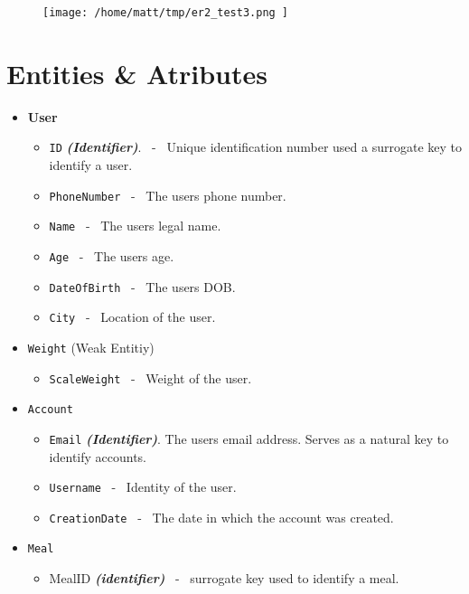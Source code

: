 \documentclass{report}
\title{\Huge{}}
\author{\huge{Matt Warner}}
\date{\huge{}}
\begin{document}
    \maketitle
\begin{figure}[ht]
\centering
\texttt{[image:  /home/matt/tmp/er2\_test3.png ]}
\end{figure}
\newpage
\section{Entities \& Atributes}
\begin{itemize}
    \item \textbf{User}
        \begin{itemize}[label=$\circ$]
            \item \texttt{ID} \textit{\textbf{(Identifier)}}. \ - \ Unique identification number used a surrogate key to identify a user.
            \item \texttt{PhoneNumber}  \ - \ The users phone number.
            \item \texttt{Name} \ - \ The users legal name.
            \item \texttt{Age} \ - \ The users age.
            \item \texttt{DateOfBirth} \ - \ The users DOB.
            \item \texttt{City} \ - \ Location of the user.
        \end{itemize}
    \item \texttt{Weight} (Weak Entitiy)
        \begin{itemize}[label=$\circ$]
            \item \texttt{ScaleWeight} \ - \ Weight of the user.
        \end{itemize}
    \item \texttt{Account}
        \begin{itemize}[label=$\circ$]
            \item \texttt{Email} \textit{\textbf{(Identifier)}}. The users email address. Serves as a natural key to identify accounts.
            \item \texttt{Username} \ - \ Identity of the user. 
            \item \texttt{CreationDate} \ - \  The date in which the account was created.
        \end{itemize}
    \item \texttt{Meal}
        \begin{itemize}[label=$\circ$]
            \item MealID \textit{\textbf{(identifier)}} \ - \ surrogate key used to identify a meal.

\end{itemize}
\end{itemize}
\end{document}

